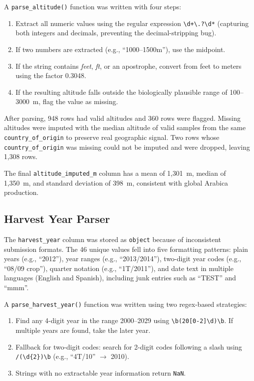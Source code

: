 \documentclass[12pt, a4paper]{article}
\begin{document}
A \texttt{parse\_altitude()} function was written with four steps:
\begin{enumerate}
  \item Extract all numeric values using the regular expression \verb|\d+\.?\d*| (capturing both
        integers and decimals, preventing the decimal-stripping bug).
  \item If two numbers are extracted (e.g., ``1000--1500m''), use the midpoint.
  \item If the string contains \textit{feet}, \textit{ft}, or an apostrophe, convert from feet to
        meters using the factor 0.3048.
  \item If the resulting altitude falls outside the biologically plausible range of 100--3000~m, flag
        the value as missing.
\end{enumerate}

After parsing, 948 rows had valid altitudes and 360 rows were flagged. Missing altitudes were
imputed with the median altitude of valid samples from the same \texttt{country\_of\_origin}
to preserve real geographic signal. Two rows whose \texttt{country\_of\_origin} was missing
could not be imputed and were dropped, leaving 1,308 rows.

The final \texttt{altitude\_imputed\_m} column has a mean of 1,301~m, median of 1,350~m, and
standard deviation of 398~m, consistent with global Arabica production.

\subsection{Harvest Year Parser}

The \texttt{harvest\_year} column was stored as \texttt{object} because of inconsistent
submission formats. The 46 unique values fell into five formatting patterns: plain years
(e.g., ``2012''), year ranges (e.g., ``2013/2014''), two-digit year codes (e.g., ``08/09 crop''),
quarter notation (e.g., ``1T/2011''), and date text in multiple languages (English and Spanish),
including junk entries such as ``TEST'' and ``mmm''.

A \texttt{parse\_harvest\_year()} function was written using two regex-based strategies:
\begin{enumerate}
  \item Find any 4-digit year in the range 2000--2029 using \verb|\b(20[0-2]\d)\b|. If multiple
        years are found, take the later year.
  \item Fallback for two-digit codes: search for 2-digit codes following a slash using
        \verb|/(\d{2})\b| (e.g., ``4T/10'' $\to$ 2010).
  \item Strings with no extractable year information return \texttt{NaN}.
\end{enumerate}
\end{document}
